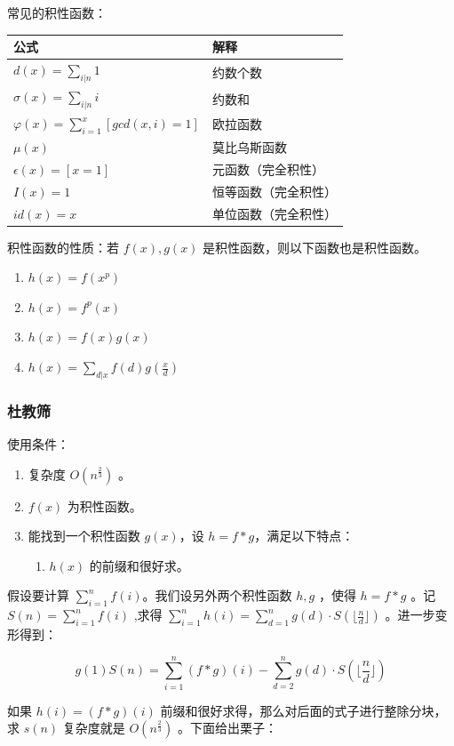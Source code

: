\documentclass[a4paper,11pt]{article}
\begin{document}
常见的积性函数：
\begin{longtable}[]{@{}ll@{}}
\toprule
公式 & 解释\tabularnewline
\midrule
\endhead
\(d(x)=\sum_{i|n}1\) & 约数个数\tabularnewline
\(\sigma(x)=\sum_{i|n}i\) & 约数和\tabularnewline
\(\varphi(x)=\sum_{i=1}^{x}{[gcd(x,i)=1]}\) & 欧拉函数\tabularnewline
\(\mu(x)\) & 莫比乌斯函数\tabularnewline
\(\epsilon(x)=[x=1]\) & 元函数（完全积性）\tabularnewline
\(I(x)=1\) & 恒等函数（完全积性）\tabularnewline
\(id(x)=x\) & 单位函数（完全积性）\tabularnewline
\bottomrule
\end{longtable}

积性函数的性质：若 \(f(x),g(x)\) 是积性函数，则以下函数也是积性函数。

\begin{enumerate}
  \item \(h(x)=f(x^p)\)
  \item \(h(x)=f^p(x)\)
  \item \(h(x)=f(x)g(x)\)
  \item \(h(x)=\sum\limits_{d|x}f(d)g(\frac{x}{d})\)
\end{enumerate}

\subsubsection{杜教筛}
使用条件：

\begin{enumerate}
  \item 复杂度 \(O(n^{\frac{2}{3}})\) 。
  \item \(f(x)\) 为积性函数。
  \item 能找到一个积性函数 \(g(x)\)，设 \(h=f*g\)，满足以下特点：
  \begin{enumerate}
    \item \(h(x)\) 的前缀和很好求。
  \end{enumerate}
\end{enumerate}

假设要计算
\(\sum\limits_{i=1}^{n}{f(i)}\)。我们设另外两个积性函数 \(h,g\) ，使得
\(h=f*g\) 。记 \(S(n)=\sum\limits_{i=1}^{n}f(i)\) ,求得
\(\sum\limits_{i=1}^{n}{h(i)}=\sum\limits_{d=1}^{n}g(d)\cdot S(\lfloor \frac{n}{d}\rfloor)\)
。进一步变形得到：

\[g(1)S(n)=\sum\limits_{i=1}^{n}(f*g)(i)-\sum\limits_{d=2}^{n}g(d)\cdot S(\lfloor \frac{n}{d} \rfloor)\]

如果 \(h(i)=(f*g)(i)\) 前缀和很好求得，那么对后面的式子进行整除分块，求
\(s(n)\) 复杂度就是 \(O(n^{\frac{2}{3}})\) 。下面给出栗子：
\end{document}
